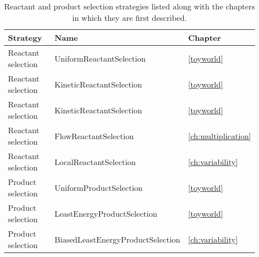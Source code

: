 \begin{table}
	\scriptsize
	\begin{center}
		\caption{Reactant and product selection strategies listed along with the chapters in which they are first described.}\label{tbl:toyworld-strategies}
		\begin{tabular}{p{4cm}p{4cm}p{5cm}}
			\toprule
			Strategy 			& Name & Chapter\\
			\midrule
			Reactant selection	& UniformReactantSelection	& \cref{toyworld}\\
			Reactant selection	& KineticReactantSelection	& \cref{toyworld}\\
			Reactant selection	& KineticReactantSelection	& \cref{toyworld}\\
			Reactant selection	& FlowReactantSelection		& \cref{ch:multiplication}\\
			Reactant selection	& LocalReactantSelection	& \cref{ch:variability}\\
			\midrule
			Product selection	& UniformProductSelection	& \cref{toyworld}\\
			Product selection	& LeastEnergyProductSelection	& \cref{toyworld}\\
			Product selection	& BiasedLeastEnergyProductSelection	& \cref{ch:variability}\\
			\bottomrule
		\end{tabular}
	\end{center}
\end{table}





